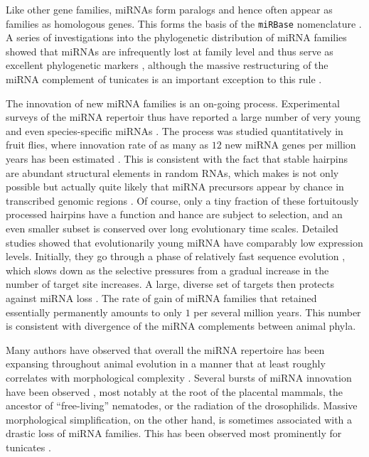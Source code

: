 \documentclass[graybox]{svmult}
\begin{document}
Like other gene families, miRNAs form paralogs \cite{Tanzer:04a, Hertel:12a}
and hence often appear as families as homologous genes. This forms the
basis of the \texttt{miRBase} nomenclature \cite{Ambrose:03a}. A series of
investigations into the phylogenetic distribution of miRNA families showed
that miRNAs are infrequently lost at family level and thus serve as
excellent phylogenetic markers
\cite{Sempere:06, Heimberg:08, Heimberg:10, Wheeler:09}, although the massive
restructuring of the miRNA complement of tunicates is an important
exception to this rule \cite{Fu:08}.

The innovation of new miRNA families is an on-going process. Experimental
surveys of the miRNA repertoir thus have reported a large number of very
young and even species-specific miRNAs \cite{Bentwich:05, Berezikov:06}. The
process was studied quantitatively in fruit flies, where innovation rate of
as many as $12$ new miRNA genes per million years has been estimated
\cite{Lu:08}. This is consistent with the fact that stable hairpins are
abundant structural elements in random RNAs, which makes is not only
possible but actually quite likely that miRNA precursors appear by chance
in transcribed genomic regions \cite{Tanzer:04a, CampoPaysaa:11, Marco:13}.
Of course, only a tiny fraction of these fortuitously processed hairpins
have a function and hance are subject to selection, and an even smaller
subset is conserved over long evolutionary time scales. Detailed studies
showed that evolutionarily young miRNA have comparably low expression
levels. Initially, they go through a phase of relatively fast sequence
evolution \cite{Liang:09, Meunier:12}, which slows down as the selective
pressures from a gradual increase in the number of target site increases. A
large, diverse set of targets then protects against miRNA loss
\cite{Lee:07a}. The rate of gain of miRNA families that retained
essentially permanently amounts to only $1$ per several million years. This
number is consistent with divergence of the miRNA complements between
animal phyla.

Many authors have observed that overall the miRNA repertoire has been
expansing throughout animal evolution in a manner that at least roughly
correlates with morphological complexity
\cite{Hertel:06a, Sempere:06, Niwa:07, Prochnik:07, Lee:07a, Heimberg:08, Peterson:09, Berezikov:11}. 
Several bursts of miRNA innovation have been observed
\cite{Hertel:06a, Heimberg:08, Tanzer:10a, Hertel:15a}, most notably at the
root of the placental mammals, the ancestor of ``free-living'' nematodes,
or the radiation of the drosophilids. Massive morphological simplification,
on the other hand, is sometimes associated with a drastic loss of miRNA
families. This has been observed most prominently for tunicates
\cite{Fu:08, Dai:09}.
\end{document}

